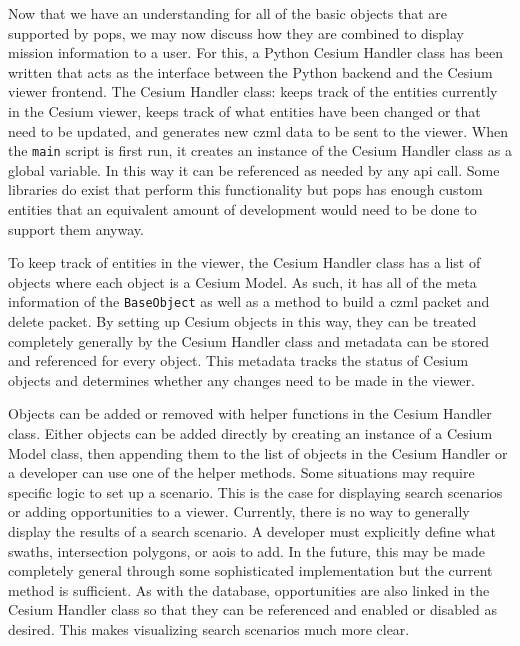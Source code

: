 Now that we have an understanding for all of the basic objects that are
supported by \gls{pops}, we may now discuss how they are combined to display
mission information to a user. For this, a Python Cesium Handler class has been
written that acts as the interface between the Python backend and the Cesium
viewer frontend. The Cesium Handler class: keeps track of the entities
currently in the Cesium viewer, keeps track of what entities have been changed
or that need to be updated, and generates new \gls{czml} data to be sent to the
viewer. When the \texttt{main} script is first run, it creates an instance of
the Cesium Handler class as a global variable. In this way it can be referenced
as needed by any \gls{api} call. Some libraries do exist that perform this
functionality but \gls{pops} has enough custom entities that an equivalent
amount of development would need to be done to support them anyway.

To keep track of entities in the viewer, the Cesium Handler class has a list of
objects where each object is a Cesium Model. As such, it has all of the meta
information of the \texttt{BaseObject} as well as a method to build a
\gls{czml} packet and delete packet. By setting up Cesium objects in this way,
they can be treated completely generally by the Cesium Handler class and
metadata can be stored and referenced for every object. This metadata tracks
the status of Cesium objects and determines whether any changes need to be made
in the viewer. 

Objects can be added or removed with helper functions in the Cesium Handler
class. Either objects can be added directly by creating an instance of a Cesium
Model class, then appending them to the list of objects in the Cesium Handler
or a developer can use one of the helper methods. Some situations may require
specific logic to set up a scenario. This is the case for displaying search
scenarios or adding opportunities to a viewer. Currently, there is no way to
generally display the results of a search scenario. A developer must explicitly
define what swaths, intersection polygons, or \glspl{aoi} to add. In the
future, this may be made completely general through some sophisticated
implementation but the current method is sufficient. As with the database,
opportunities are also linked in the Cesium Handler class so that they can be
referenced and enabled or disabled as desired. This makes visualizing search
scenarios much more clear. 

